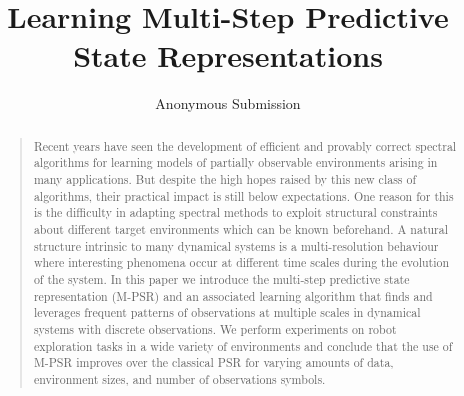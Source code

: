 \documentclass[letterpaper]{article}
\begin{document}
\title{Learning Multi-Step Predictive State Representations}
\author{Anonymous Submission}
\maketitle

\begin{abstract}
\begin{quote}
Recent years have seen the development of efficient and provably correct spectral algorithms for learning models of partially observable environments arising in many applications. But despite the high hopes raised by this new class of algorithms, their practical impact is still below expectations. One reason for this is the difficulty in adapting spectral methods to exploit structural constraints about different target environments which can be known beforehand. A natural structure intrinsic to many dynamical systems is a multi-resolution behaviour where interesting phenomena occur at different time scales during the evolution of the system. In this paper we introduce the multi-step predictive state representation (M-PSR) and an associated learning algorithm that finds and leverages frequent patterns of observations at multiple scales in dynamical systems with discrete observations. We perform experiments on robot exploration tasks in a wide variety of environments and conclude that the use of M-PSR improves over the classical PSR for varying amounts of data, environment sizes, and number of observations symbols.

\end{quote}
\end{abstract}
\end{document}
